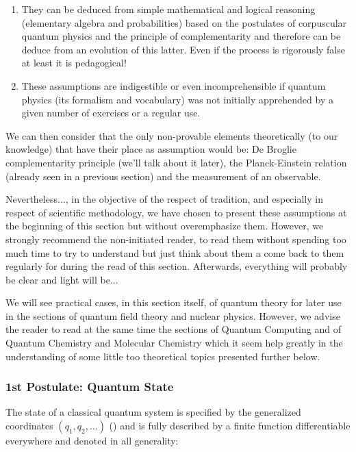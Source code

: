 	\begin{enumerate}
		\item They can be deduced from simple mathematical and logical reasoning (elementary algebra and probabilities) based on the postulates of corpuscular quantum physics and the principle of complementarity and therefore can be deduce from an evolution of this latter. Even if the process is rigorously false at least it is pedagogical!
		\item These assumptions are indigestible or even incomprehensible if quantum physics (its formalism and vocabulary) was not initially apprehended by a given number of exercises or a regular use.
	\end{enumerate}
	We can then consider that the only non-provable elements theoretically (to our knowledge) that have their place as assumption would be: De Broglie complementarity principle (we'll talk about it later), the Planck-Einstein relation (already seen in a previous section) and the measurement of an observable.
	
	Nevertheless..., in the objective of the respect of tradition, and especially in respect of scientific methodology, we have chosen to present these assumptions at the beginning of this section but without overemphasize them. However, we strongly recommend the non-initiated reader, to read them without spending too much time to try to understand but just think about them a come back to them regularly for during the read of this section. Afterwards, everything will probably be clear and light will be...

	
	\begin{tcolorbox}[title=Remark,colframe=black,arc=10pt]
	We will see practical cases, in this section itself, of quantum theory for later use in the sections of quantum field theory and nuclear physics. However, we advise the reader to read at the same time the sections of Quantum Computing and of Quantum Chemistry and Molecular Chemistry which it seem help greatly in the understanding of some little too theoretical topics presented further below.
	\end{tcolorbox}
	
	\subsubsection{1st Postulate: Quantum State}
	The state of a classical quantum system is specified by the generalized coordinates $(q_1,q_2,...)$ () and is fully described by a finite function differentiable everywhere and denoted in all generality:
	
